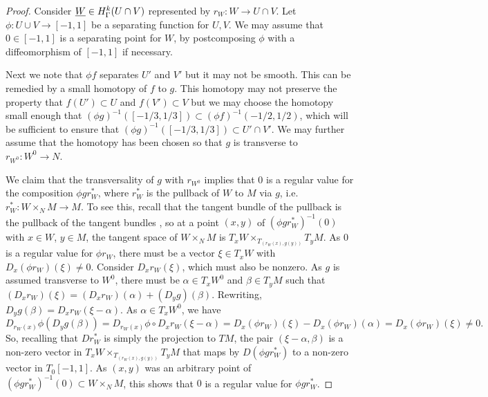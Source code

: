 \begin{proof}
	Consider $\underline{W} \in H^k_\Gamma(U \cap V)$ represented by $r_W \colon W \to U \cap V$.
	Let $\phi \colon U \cup V \to [-1,1]$ be a separating function for $U,V$.
	We may assume that $0 \in [-1,1]$ is a separating point for $W$, by postcomposing $\phi$ with a diffeomorphism of $[-1,1]$ if necessary.

	Next we note that $\phi f$ separates $U'$ and $V'$ but it may not be smooth.
	This can be remedied by a small homotopy of $f$ to $g$.
	This homotopy may not preserve the property that $f(U') \subset U$ and $f(V') \subset V$ but we may choose the homotopy small enough that $(\phi g)^{-1}([-1/3,1/3]) \subset (\phi f)^{-1}(-1/2,1/2)$, which will be sufficient to ensure that $(\phi g)^{-1}([-1/3,1/3]) \subset U' \cap V'$.
	We may further assume that the homotopy has been chosen so that $g$ is transverse to $r_{W^0} \colon W^0 \to N$.

	We claim that the transversality of $g$ with $r_{W^0}$ implies that $0$ is a regular value for the composition $\phi gr_W^*$, where $r_W^*$ is the pullback of $W$ to $M$ via $g$, i.e.\ $r_W^*: W \times_N M \to M$.
	To see this, recall that the tangent bundle of the pullback is the pullback of the tangent bundles \cite[Theorem 5.47]{Wed16}, so at a point $(x,y)$ of $(\phi gr^*_{W})^{-1}(0)$ with $x \in W$, $y \in M$, the tangent space of $W \times_N M$ is $T_x W \times_{T_{( r_W(x),g(y))}} T_yM$.
	As $0$ is a regular value for $\phi r_W$, there must be a vector $\xi \in T_xW$ with $D_x(\phi r_W)(\xi)\neq 0$.
	Consider $D_xr_W(\xi)$, which must also be nonzero.
	As $g$ is assumed transverse to $W^0$, there must be $\alpha \in T_xW^0$ and $\beta \in T_yM$ such that $(D_xr_W)(\xi) = (D_xr_W)(\alpha) + (D_yg) (\beta)$.
	Rewriting, $D_yg (\beta) = D_xr_W(\xi-\alpha)$.
	As $\alpha \in T_xW^0$, we have $$D_{r_W(x)}\phi(D_yg (\beta)) = D_{r_W(x)}\phi \circ D_xr_W(\xi-\alpha) = D_x(\phi r_W)(\xi)-D_x(\phi r_W)(\alpha) = D_x(\phi r_W)(\xi)\neq 0.$$
	So, recalling that $Dr_W^*$ is simply the projection to $TM$, the pair $( \xi-\alpha, \beta)$ is a non-zero vector in $T_xW\times_{T_{( r_W(x), g(y))}}T_y M$ that maps by $D(\phi gr_W^*)$ to a non-zero vector in $T_{0}[-1,1]$.
	As $(x,y)$ was an arbitrary point of $(\phi gr^*_{W})^{-1}(0) \subset W \times_N M$, this shows that $0$ is a regular value for $\phi gr^*_W$.


\end{proof}
